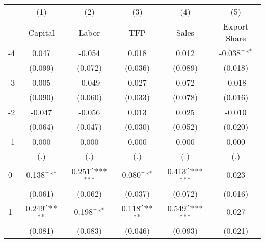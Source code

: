 {
\def\sym#1{\ifmmode^{#1}\else\(^{#1}\)\fi}
\begin{tabular}{l*{5}{c}}
\hline\hline
                    &\multicolumn{1}{c}{(1)}&\multicolumn{1}{c}{(2)}&\multicolumn{1}{c}{(3)}&\multicolumn{1}{c}{(4)}&\multicolumn{1}{c}{(5)}\\
                    &\multicolumn{1}{c}{Capital}&\multicolumn{1}{c}{Labor}&\multicolumn{1}{c}{TFP}&\multicolumn{1}{c}{Sales}&\multicolumn{1}{c}{Export Share}\\
\hline
-4                  &       0.047         &      -0.054         &       0.018         &       0.012         &      -0.038\sym{*}  \\
                    &     (0.099)         &     (0.072)         &     (0.036)         &     (0.089)         &     (0.018)         \\
[1em]
-3                  &       0.005         &      -0.049         &       0.027         &       0.072         &      -0.018         \\
                    &     (0.090)         &     (0.060)         &     (0.033)         &     (0.078)         &     (0.016)         \\
[1em]
-2                  &      -0.047         &      -0.056         &       0.013         &       0.025         &      -0.010         \\
                    &     (0.064)         &     (0.047)         &     (0.030)         &     (0.052)         &     (0.020)         \\
[1em]
-1                  &       0.000         &       0.000         &       0.000         &       0.000         &       0.000         \\
                    &         (.)         &         (.)         &         (.)         &         (.)         &         (.)         \\
[1em]
0                   &       0.138\sym{*}  &       0.251\sym{***}&       0.080\sym{*}  &       0.413\sym{***}&       0.023         \\
                    &     (0.061)         &     (0.062)         &     (0.037)         &     (0.072)         &     (0.016)         \\
[1em]
1                   &       0.249\sym{**} &       0.198\sym{*}  &       0.118\sym{**} &       0.549\sym{***}&       0.027         \\
                    &     (0.081)         &     (0.083)         &     (0.046)         &     (0.093)         &     (0.021)         \\

\end{tabular}}
